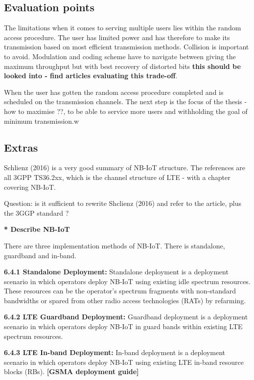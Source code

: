\documentclass[10pt,a4paper,titlepage,twoside]{article}
\newcommand{\tilv}[1]{\textbf{\color{ymagreen} [#1]}}
\newcommand{\point}[1]{\textbf{\color{ymared} #1}}
\begin{document}
\subsection{Evaluation points}

The limitations when it comes to serving multiple users lies within the random access procedure. The user has limited power and has therefore to make its transmission based on most efficient transmission methods. Collision is important to avoid. Modulation and coding scheme have to navigate between giving the maximum throughput but with best recovery of distorted bits \point{this should be looked into - find articles evaluating this trade-off}.

When the user has gotten the random access procedure completed and is scheduled on the transmission channels. The next step is the focus of the thesis - how to maximise ??, to be able to service more users and withholding the goal of minimum transmission.w


\subsection{Extras}

Schlienz (2016) \cite{schlienz} is a very good summary of NB-IoT structure. The references are all 3GPP TS36.2xx, which is the channel structure of LTE - with a chapter covering NB-IoT.

Question: is it sufficient to rewrite Shclienz (2016) and refer to the article, plus the 3GGP standard ?

\point{* Describe NB-IoT}

There are three implementation methods of NB-IoT. There is standalone, guardband and in-band.

\textbf{6.4.1 Standalone Deployment:}
Standalone deployment is a deployment scenario in which operators deploy NB-IoT using
existing idle spectrum resources. These resources can be the operator’s spectrum
fragments with non-standard bandwidths or spared from other radio access technologies
(RATs) by refarming.

\textbf{6.4.2 LTE Guardband Deployment:}
Guardband deployment is a deployment scenario in which operators deploy NB-IoT in guard
bands within existing LTE spectrum resources.

\textbf{6.4.3 LTE In-band Deployment:}
In-band deployment is a deployment scenario in which operators deploy NB-IoT using
existing LTE in-band resource blocks (RBs).
\tilv{GSMA deployment guide}
\end{document}

